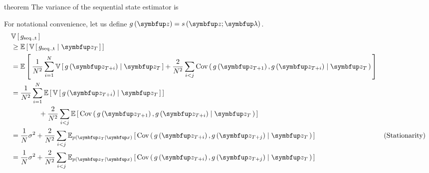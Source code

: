 
\begin{theoremEnd}{theorem}
  The variance of the sequential state estimator is
\end{theoremEnd}
\begin{proofEnd}
  For notational convenience, let us define \(g\left(\vz\right) = s\left(\vz; \vlambda\right)\).
  \begin{align}
    &\V{g_{\mathrm{seq., t}}} \\
    &\geq \E{ \V{g_{\mathrm{seq., t}} \mid \vz_{T}} } \\
    &= \E{
      \frac{1}{N^2} \sum^{N}_{i=1} \V{ g\left(\vz_{T+i}\right) \mid \vz_{T} }
      + \frac{2}{N^2} \sum_{i<j} \Cov{g\left(\vz_{T+1}\right), g\left(\vz_{T+i}\right) \mid \vz_{T} }
    } \\
    &=
      \frac{1}{N^2} \sum^{N}_{i=1} \E{ \V{ g\left(\vz_{T+i}\right) \mid \vz_{T} }
      }\\
      &\qquad\qquad + \frac{2}{N^2} \sum_{i<j} \E{ \Cov{g\left(\vz_{T+1}\right), g\left(\vz_{T+i}\right) \mid \vz_{T} }
    } \\
    &= 
    \frac{1}{N} \sigma^2 +
    \frac{2}{N^2} \sum_{i < j}
    \Esub{p\left(\vz_T\mid\vx\right)}{
      \Cov{ g\left(\vz_{T+i}\right), g\left(\vz_{T+j}\right) \mid \vz_T}
    }  &\text{(Stationarity)} \\
    &= 
    \frac{1}{N} \sigma^2 +
    \frac{2}{N^2} \sum_{i < j}
    \Esub{p\left(\vz_T\mid\vx\right)}{
      \Cov{ g\left(\vz_{T+i}\right), g\left(\vz_{T+j}\right) \mid \vz_T}
    } 
  \end{align}
\end{proofEnd}

